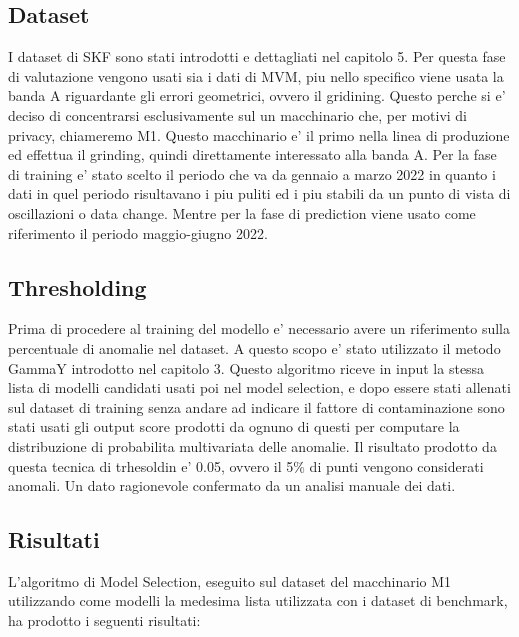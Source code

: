 \subsection{Dataset}
I dataset di SKF sono stati introdotti e dettagliati nel capitolo 5. Per questa fase di valutazione vengono usati sia i dati di MVM, piu nello specifico viene usata la banda A riguardante gli errori geometrici, ovvero il gridining. Questo perche si e' deciso di concentrarsi esclusivamente sul un macchinario che, per motivi di privacy, chiameremo M1. Questo macchinario e' il primo nella linea di produzione ed effettua il grinding, quindi direttamente interessato alla banda A.
Per la fase di training e' stato scelto il periodo che va da gennaio a marzo 2022 in quanto i dati in quel periodo risultavano i piu puliti ed i piu stabili da un punto di vista di oscillazioni o data change. Mentre per la fase di prediction viene usato come riferimento il periodo maggio-giugno 2022.



\subsection{Thresholding}
Prima di procedere al training del modello e' necessario avere un riferimento sulla percentuale di anomalie nel dataset. A questo scopo e' stato utilizzato il metodo GammaY introdotto nel capitolo 3.
Questo algoritmo riceve in input la stessa lista di modelli candidati usati poi nel model selection, e dopo essere stati allenati sul dataset di training senza andare ad indicare il fattore di contaminazione sono stati usati gli output score prodotti da ognuno di questi per computare la distribuzione di probabilita multivariata delle anomalie.
Il risultato prodotto da questa tecnica di trhesoldin e' 0.05, ovvero il 5\% di punti vengono considerati anomali. Un dato ragionevole confermato da un analisi manuale dei dati.


\subsection{Risultati}
L'algoritmo di Model Selection, eseguito sul dataset del macchinario M1 utilizzando come modelli la medesima lista utilizzata con i dataset di benchmark, ha prodotto i seguenti risultati:



